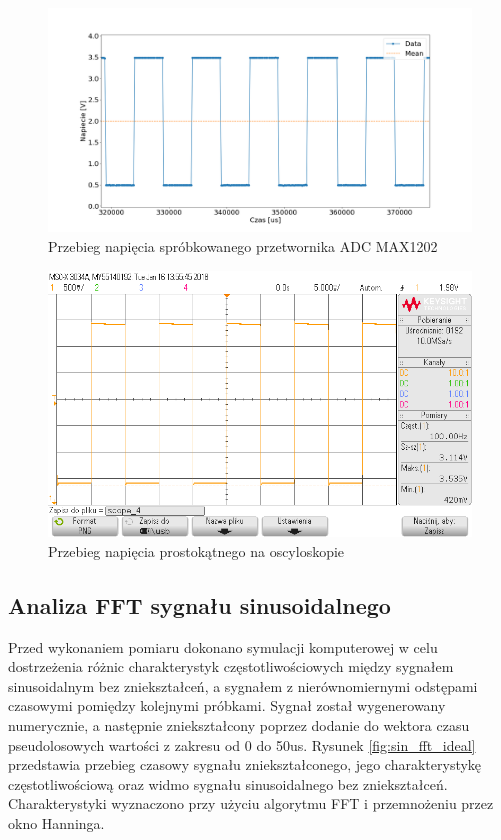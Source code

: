 \begin{figure}[H]
	\centering
		\includegraphics[width=14cm]{rect_max1202_100Hz_adc}
	\caption{Przebieg napięcia spróbkowanego przetwornika ADC MAX1202} 
	\label{fig:rect_max1202_100Hz_adc}
\end{figure}


\begin{figure}[H]
	\centering
		\includegraphics[width=16cm]{rect_max1202_100Hz_osc}
	\caption{Przebieg napięcia prostokątnego na oscyloskopie} 
	\label{fig:rect_max1202_100Hz_osc}
\end{figure}

\subsection{Analiza FFT sygnału sinusoidalnego}

Przed wykonaniem pomiaru dokonano symulacji komputerowej w celu dostrzeżenia różnic charakterystyk częstotliwościowych między sygnałem sinusoidalnym bez zniekształceń, a sygnałem z nierównomiernymi odstępami czasowymi pomiędzy kolejnymi próbkami. 
Sygnał został wygenerowany numerycznie, a następnie zniekształcony poprzez dodanie do wektora czasu pseudolosowych wartości z zakresu od 0 do 50us. Rysunek \ref{fig:sin_fft_ideal} przedstawia przebieg czasowy sygnału zniekształconego, jego charakterystykę częstotliwościową oraz widmo sygnału sinusoidalnego bez zniekształceń. Charakterystyki wyznaczono przy użyciu algorytmu FFT i przemnożeniu przez okno Hanninga.

